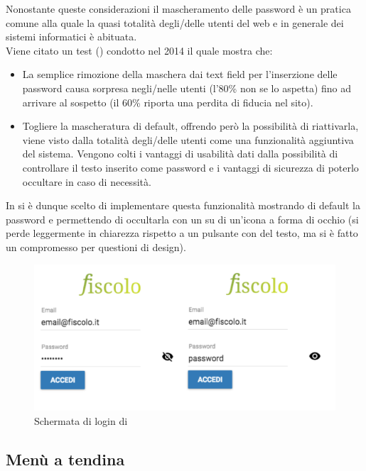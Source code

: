 Nonostante queste considerazioni il mascheramento delle password è un pratica comune
alla quale la quasi totalità degli/delle utenti del web e in generale dei sistemi informatici
è abituata.\\

Viene citato un test (\cite{pass-test}) condotto nel 2014 il quale mostra che:

\begin{itemize}
\item La semplice rimozione della maschera dai text field per l'inserzione delle password
causa sorpresa negli/nelle utenti (l'80\% non se lo aspetta) fino ad arrivare al sospetto
(il 60\% riporta una perdita di fiducia nel sito).
\item Togliere la mascheratura di default, offrendo però la possibilità di riattivarla,
viene visto dalla totalità degli/delle utenti come una funzionalità aggiuntiva del sistema.
Vengono colti i vantaggi di usabilità dati dalla possibilità di controllare il testo
inserito come password e i vantaggi di sicurezza di poterlo occultare in caso di necessità.
\end{itemize}

In \fiscoloMobile{} si è dunque scelto di implementare questa funzionalità mostrando di
default la password e permettendo di occultarla con un  su di un'icona a forma di
occhio
(si perde leggermente in chiarezza rispetto a un pulsante con del testo, ma si è fatto un
compromesso per questioni di design).

\begin{figure}[H]\label{imgLoginPassword}
	\centering
	\includegraphics[width=.8\columnwidth]{images/loginPage.png}
	\caption{Schermata di login di \fiscoloMobile}
\end{figure}

\subsection[Menù a tendina]{Menù a tendina}

